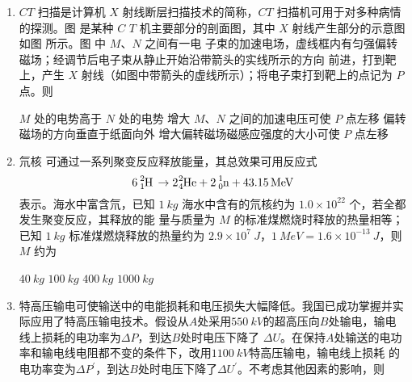 \begin{enumerate}
\item
$ CT $ 扫描是计算机 $ X $ 射线断层扫描技术的简称，$ CT $ 扫描机可用于对多种病情的探测。图  是某种 $ C $
$ T $ 机主要部分的剖面图，其中 $ X $ 射线产生部分的示意图如图  所示。图  中 $ M $、$ N $ 之间有一电
子束的加速电场，虚线框内有匀强偏转磁场；经调节后电子束从静止开始沿带箭头的实线所示的方向
前进，打到靶上，产生 $ X $ 射线（如图中带箭头的虚线所示）；将电子束打到靶上的点记为 $ P $ 点。则  
\begin{figure}[h!]
\centering
\begin{subfigure}{0.45\linewidth}
\centering
 
\caption{}\label{2020:全国2:4a}
\end{subfigure}
\hfil
\begin{subfigure}{0.45\linewidth}
\centering
 
\caption{}\label{2020:全国2:4b}
\end{subfigure}

\end{figure}


\fourchoices
{$ M $ 处的电势高于 $ N $ 处的电势}
{增大 $ M $、$ N $ 之间的加速电压可使 $ P $ 点左移}
{偏转磁场的方向垂直于纸面向外}
{增大偏转磁场磁感应强度的大小可使 $ P $ 点左移}



\item
氘核  可通过一系列聚变反应释放能量，其总效果可用反应式
\[ \ce{6^{2}_{1}H \rightarrow {2}_{4}^{2}He + 2^{1}_{0}n + 43.15MeV} \]
表示。海水中富含氘，已知 $ 1 \ kg $ 海水中含有的氘核约为 $ 1.0 \times 10^{22} $ 个，若全都发生聚变反应，其释放的能
量与质量为 $ M $ 的标准煤燃烧时释放的热量相等；已知 $ 1 \ kg $ 标准煤燃烧释放的热量约为 $ 2.9 \times 10^{7} \ J $，$ 1 \ MeV=1.6 \times 10^{-13} \ J $，则 $ M $ 约为  

\fourchoices
{$ 40 \ kg $}
{$ 100 \ kg $}
{$ 400 \ kg $}
{$ 1000 \ kg $}


\item
特高压输电可使输送中的电能损耗和电压损失大幅降低。我国已成功掌握并实际应用了特高压输电技术。假设从$ A $处采用$ 550 \ kV $的超高压向$ B $处输电，输电线上损耗的电功率为$ \Delta P $，到达$ B $处时电压下降了
$ \Delta U $。在保持$ A $处输送的电功率和输电线电阻都不变的条件下，改用$ 1100 \ kV $特高压输电，输电线上损耗
的电功率变为$ \Delta P ^{\prime} $，到达$ B $处时电压下降了$ \Delta U ^{\prime} $。不考虑其他因素的影响，则  


\end{enumerate}
